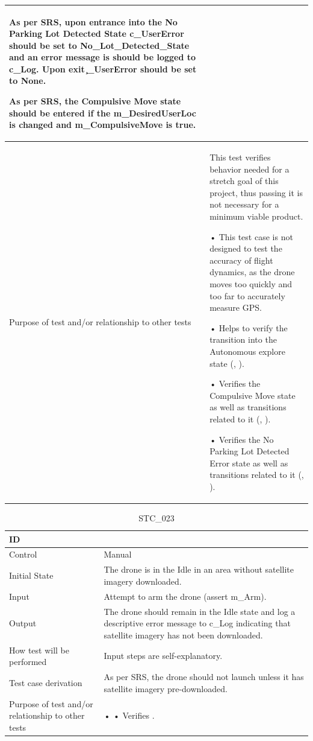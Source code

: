 \documentclass[12pt, titlepage]{article}
\begin{document}
\begin{table}[!h]
\begin{center}
\begin{tabular}{ | m{1.5cm} | m{15cm} | }
As per SRS, upon entrance into the No Parking Lot Detected State c\_UserError should be set to No_Lot_Detected_State and an error message is should be logged to c\_Log. Upon exit \c_UserError should be set to None.

As per SRS, the Compulsive Move state should be entered if the m\_DesiredUserLoc is changed and m\_CompulsiveMove is true. 
 \\ 
\hline
Purpose of test and/or relationship to other tests & 
This test verifies behavior needed for a stretch goal of this project, thus passing it is not necessary for a minimum viable product.

• This test case is not designed to test the accuracy of flight dynamics, as the drone moves too quickly and too far to accurately measure GPS.

• Helps to verify the transition into the Autonomous explore state (\nameref{STA_003}, \nameref{TRANS_004}). 

• Verifies the Compulsive Move state as well as transitions related to it (\nameref{STA_011}, \nameref{TRANS_012}).

• Verifies the No Parking Lot Detected Error state as well as transitions related to it (\nameref{STA_008}, \nameref{TRANS_008}).
\\ 
\hline
\end{tabular}
\end{center}
\end{table}

\begin{table}[!h]
\begin{center}
\caption {STC\_023}
\label{tab:STC_023}
\begin{tabular}{ | m{1.5cm} | m{15cm} | } 
\hline
ID & \nameref{tab:STC_023} \\ 
\hline
Control & Manual \\ 
\hline
Initial State & The drone is in the Idle in an area without satellite imagery downloaded. \\ 
\hline
Input & Attempt to arm the drone (assert m\_Arm). \\ 
\hline
Output & The drone should remain in the Idle state and log a descriptive error message to c\_Log indicating that satellite imagery has not been downloaded.  \\ 
\hline
How test will be performed & Input steps are self-explanatory.
 \\ 
\hline
Test case derivation & As per SRS, the drone should not launch unless it has satellite imagery pre-downloaded.
 \\ 
\hline
Purpose of test and/or relationship to other tests &  • 
• Verifies \nameref{SR_001}.
\\ 
\hline
\end{tabular}
\end{center}
\end{table}
\end{document}
